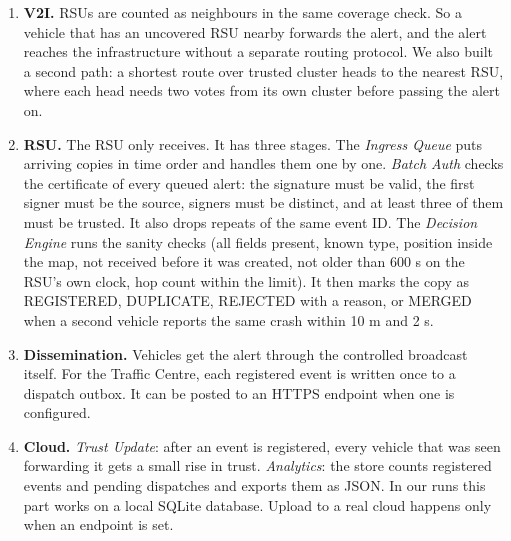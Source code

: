 \documentclass[11pt, a4paper]{article}
\begin{document}
\begin{enumerate}[leftmargin=*, itemsep=3pt, topsep=2pt]
    \item \textbf{V2I.} RSUs are counted as neighbours in the same coverage check. So a vehicle that has an uncovered RSU nearby forwards the alert, and the alert reaches the infrastructure without a separate routing protocol. We also built a second path: a shortest route over trusted cluster heads to the nearest RSU, where each head needs two votes from its own cluster before passing the alert on.
    \item \textbf{RSU.} The RSU only receives. It has three stages. The \emph{Ingress Queue} puts arriving copies in time order and handles them one by one. \emph{Batch Auth} checks the certificate of every queued alert: the signature must be valid, the first signer must be the source, signers must be distinct, and at least three of them must be trusted. It also drops repeats of the same event ID. The \emph{Decision Engine} runs the sanity checks (all fields present, known type, position inside the map, not received before it was created, not older than 600 s on the RSU's own clock, hop count within the limit). It then marks the copy as REGISTERED, DUPLICATE, REJECTED with a reason, or MERGED when a second vehicle reports the same crash within 10 m and 2 s.
    \item \textbf{Dissemination.} Vehicles get the alert through the controlled broadcast itself. For the Traffic Centre, each registered event is written once to a dispatch outbox. It can be posted to an HTTPS endpoint when one is configured.
    \item \textbf{Cloud.} \emph{Trust Update}: after an event is registered, every vehicle that was seen forwarding it gets a small rise in trust. \emph{Analytics}: the store counts registered events and pending dispatches and exports them as JSON. In our runs this part works on a local SQLite database. Upload to a real cloud happens only when an endpoint is set.
\end{enumerate}
\end{document}
